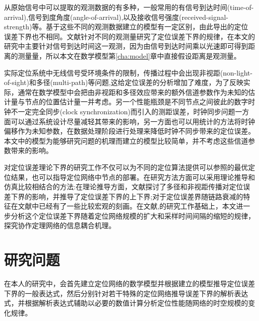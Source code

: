 从原始信号中可以提取的观测数据的有多种，一般常用的有信号到达时间(time-of-arrival),信号到度角度(angle-of-arrival),以及接收信号强度(received-signal-strength)等。基于这些不同的观测数据建立的模型有一定区别，由此导出的定位误差下界也不相同。文献\cite{LimitBound}针对不同的观测量研究了定位误差下界的规律，在本文的研究中主要针对信号到达时间这一观测，因为由信号到达时间乘以光速即可得到距离的测量量，所以本文在数学模型第\ref{cha:model}章中直接假设距离是观测量。

实际定位系统中无线信号受环境条件的限制，传播过程中会出现非视距(non-light-of-sight)和多径(multi-path)等问题\cite{indoorPos},这给定位误差的分析增加了难度，为了反映实际，通常在数学模型中会把由非视距和多径效应带来的额外信道参数作为未知的估计量与节点的位置估计量一并考虑\cite{LimitBound}。另一个性能瓶颈是不同节点之间彼此的数字时钟不一定完全同步(clock synchronization)而引入的测距误差\cite{indoorPos}，时钟同步问题一方面可以通过系统设计尽量减轻其带来的影响，另一方面也可以用统计的方法将时钟偏移作为未知参数，在数据处理阶段进行处理来降低时钟不同步带来的定位误差。本文中的模型为能够研究问题的机理而建立的模型比较简单，并不考虑这些信道参数带来的影响。

对定位误差理论下界的研究工作不仅可以为不同的定位算法提供可以参照的最优定位结果，也可以指导定位网络中节点的部署。在研究方法方面可以采用理论推导和仿真比较相结合的方法:在理论推导方面，文献\cite{LimitBound}探讨了多径和非视距传播对定位误差下界的影响，并推导了定位误差下界的上下界;对于定位误差界随链路衰减的特征在文献\cite{siyi}中已经有了一些比较宏观的刻画。在文献\cite{LimitBound},\cite{siyi}的研究工作基础上，本文进一步分析这个定位误差下界随着定位网络规模的扩大和采样时间间隔的缩短的规律，探究协作定理网络的信息耦合机理。

\section{研究问题}
在本人的研究中，会首先建立定位网络的数学模型并根据建立的模型推导定位误差下界的一般表达式，然后分别针对若干特殊的定位网络推导误差下界的解析表达式，并根据解析表达式辅助以必要的数值计算分析定位性能随网络的时空规模的变化规律。

